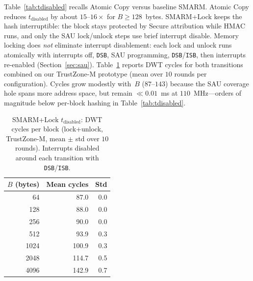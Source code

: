 \documentclass[conference]{IEEEtran}
\newcommand{\tdis}{$t_{\mathrm{disabled}}$\xspace}
\newcommand{\smarmlock}{SMARM+Lock\xspace}
\begin{document}
Table~\ref{tab:tdisabled} recalls Atomic Copy versus baseline SMARM.
Atomic Copy reduces \tdis by about $15$--$16\times$ for
$B\geq 128$~bytes.
\smarmlock{} keeps the hash interruptible: the block stays
protected by Secure attribution while HMAC runs, and only the SAU
lock/unlock steps use brief interrupt disable.
Memory locking does \emph{not} eliminate interrupt disablement: each
lock and unlock runs atomically with interrupts off, \texttt{DSB}, SAU
programming, \texttt{DSB}/\texttt{ISB}, then interrupts re-enabled
(Section~\ref{sec:sau}). Table~\ref{tab:tdis_lock} reports DWT cycles
for both transitions combined on our TrustZone-M prototype (mean over
$10$ rounds per configuration). Cycles grow modestly with~$B$
($87$--$143$) because the SAU coverage hole spans more address space,
but remain $\ll 0.01$~ms at $110$~MHz---orders of magnitude below
per-block hashing in Table~\ref{tab:tdisabled}.

\begin{table}[!t]
  \centering
  \small
  \caption{\smarmlock{} \tdis{}: DWT cycles per block (lock+unlock,
    TrustZone-M, mean $\pm$ std over $10$ rounds). Interrupts disabled
    around each transition with \texttt{DSB}/\texttt{ISB}.}
  \label{tab:tdis_lock}
  \setlength{\tabcolsep}{4pt}
  \begin{tabular}{rrr}
    \toprule
    \textbf{$B$ (bytes)} & \textbf{Mean cycles} & \textbf{Std} \\
    \midrule
    64   & 87.0 & 0.0 \\
    128  & 88.0 & 0.0 \\
    256  & 90.0 & 0.0 \\
    512  & 93.9 & 0.3 \\
    1024 & 100.9 & 0.3 \\
    2048 & 114.7 & 0.5 \\
    4096 & 142.9 & 0.7 \\
    \bottomrule
  \end{tabular}
\end{table}
\end{document}

